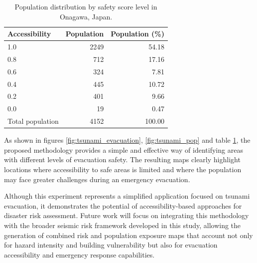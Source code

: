 \begin{table}[h]
\centering
\begin{tabular}{lrr}
\hline
Accessibility & Population & Population (\%) \\
\hline
1.0 & 2249 & 54.18 \\
0.8 & 712 & 17.16 \\
0.6 & 324 & 7.81 \\
0.4 & 445 & 10.72 \\
0.2 & 401 & 9.66 \\
0.0 & 19 & 0.47 \\
Total population & 4152 & 100.00 \\
\hline
\end{tabular}
\caption{Population distribution by safety score level in Onagawa, Japan.}
\label{tab:accessibility_population}
\end{table}

As shown in figures \ref{fig:tsunami_evacuation}, \ref{fig:tsunami_pop} and table \ref{tab:accessibility_population}, the proposed methodology provides a simple and effective way of identifying areas with different levels of evacuation safety. The resulting maps clearly highlight locations where accessibility to safe areas is limited and where the population may face greater challenges during an emergency evacuation.

Although this experiment represents a simplified application focused on tsunami evacuation, it demonstrates the potential of accessibility-based approaches for disaster risk assessment. Future work will focus on integrating this methodology with the broader seismic risk framework developed in this study, allowing the generation of combined risk and population exposure maps that account not only for hazard intensity and building vulnerability but also for evacuation accessibility and emergency response capabilities.
